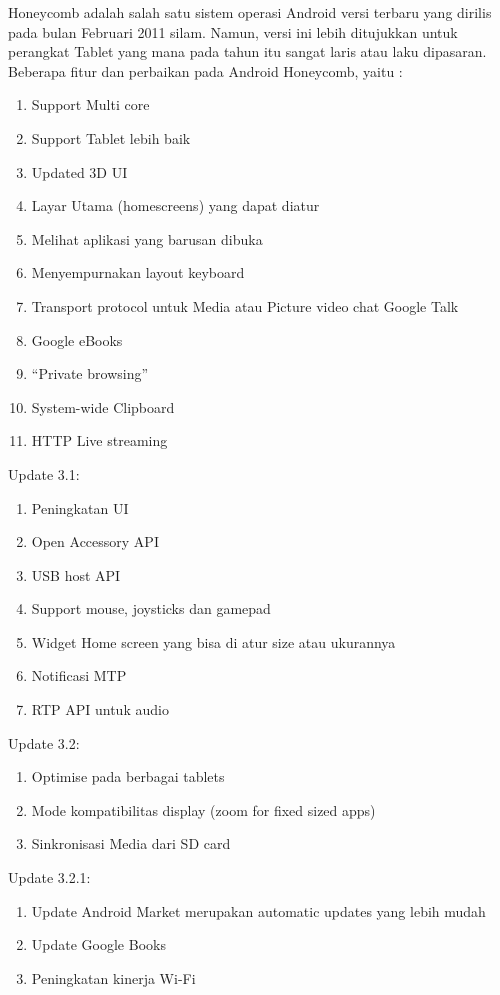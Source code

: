 \begin{enumerate}
Honeycomb adalah salah satu sistem operasi Android versi terbaru yang dirilis pada bulan Februari 2011 silam. Namun, versi ini lebih ditujukkan untuk perangkat Tablet yang mana pada tahun itu sangat laris atau laku dipasaran. Beberapa fitur dan perbaikan pada Android Honeycomb, yaitu :
\begin{enumerate}
    \item Support Multi core
    \item Support Tablet lebih baik
    \item Updated 3D UI
    \item Layar Utama (homescreens) yang dapat diatur
    \item Melihat aplikasi yang barusan dibuka
    \item Menyempurnakan layout keyboard
    \item Transport protocol untuk Media atau Picture video chat Google Talk
    \item Google eBooks
    \item “Private browsing”
    \item System-wide Clipboard
    \item HTTP Live streaming
\end{enumerate}
Update 3.1:
\begin{enumerate}
    \item Peningkatan UI
    \item Open Accessory API
    \item USB host API
    \item Support mouse, joysticks dan gamepad
    \item Widget Home screen yang bisa di atur size atau ukurannya
    \item Notificasi MTP
    \item RTP API untuk audio
\end{enumerate}
Update 3.2:
\begin{enumerate}
    \item Optimise pada berbagai tablets
    \item Mode kompatibilitas display (zoom for fixed sized apps)
    \item Sinkronisasi Media dari SD card
\end{enumerate}
Update 3.2.1:
\begin{enumerate}
    \item Update Android Market merupakan automatic updates yang lebih mudah
    \item Update Google Books
    \item Peningkatan kinerja Wi-Fi

\end{enumerate}
\end{enumerate}
